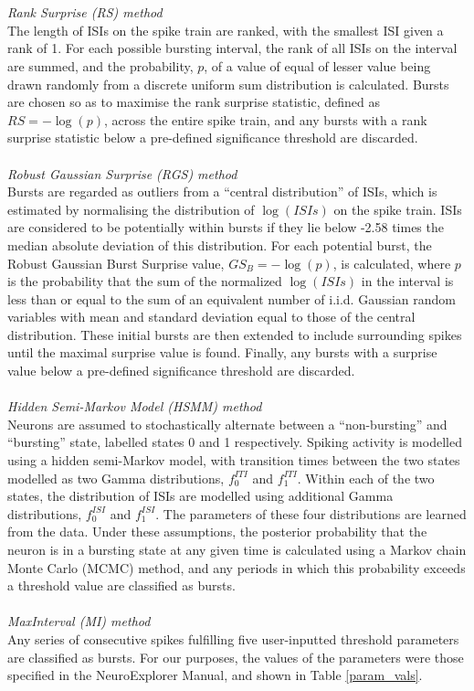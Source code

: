 \documentclass[12pt, titlepage]{article}
\begin{document}
	\\ \\ \textit{Rank Surprise (RS) method \cite{Gourevitch2007}}
	\\The length of ISIs on the spike train are ranked,  with the smallest ISI given a rank of 1. For each possible bursting interval, the rank of all ISIs on the interval are summed, and the probability, $p$, of a value of equal of lesser value  being drawn randomly from a discrete uniform sum distribution is calculated. Bursts are chosen so as to maximise the rank surprise statistic, defined as $RS=-\log(p)$, across the entire spike train, and any bursts with a rank surprise statistic below a pre-defined significance threshold are discarded\nocite{Gourevitch2007}. 
	\\ \\ \textit{Robust Gaussian Surprise (RGS) method \cite{Ko2012}}
	\\Bursts are regarded as outliers from a ``central distribution'' of ISIs, which is estimated by normalising the distribution of $\log(ISIs)$ on the spike train. ISIs are considered to be potentially within bursts if they lie below -2.58 times the median absolute deviation of this distribution. For each potential burst, the Robust Gaussian Burst Surprise value, $GS_B=-\log(p)$, is calculated, where $p$ is the probability that the sum of the normalized $\log(ISIs)$ in the interval is less than or equal to the sum of an equivalent number of i.i.d. Gaussian random variables with mean and standard deviation equal to those of the central distribution. These initial bursts are then extended to include surrounding spikes until the maximal surprise value is found. Finally, any bursts with a surprise value below a pre-defined significance threshold are discarded.
	\\ \\ \textit{Hidden Semi-Markov Model (HSMM) method \cite{Tokdar2010}}
	\\Neurons are assumed to stochastically alternate between a ``non-bursting'' and ``bursting'' state, labelled states 0 and 1 respectively. Spiking activity is modelled using a hidden semi-Markov model, with transition times between the two states modelled as two Gamma distributions,  $f_0^{ITI}$ and $f_1^{ITI}$.  Within each of the two states, the distribution of ISIs are modelled using additional Gamma distributions, $f_0^{ISI}$ and $f_1^{ISI}$. The parameters of these four distributions are learned from the data. Under these assumptions, the posterior probability that the neuron is in a bursting state at any given time is calculated using a Markov chain Monte Carlo (MCMC) method, and any periods in which this probability exceeds a threshold value are classified as bursts.
	\\ \\ \textit{MaxInterval (MI) method  \cite{NEmanual}}
	\\Any series of consecutive spikes fulfilling five user-inputted threshold parameters are classified as bursts. For our purposes, the values of the parameters were those specified in the NeuroExplorer Manual, and shown in Table \ref{param_vals}.
\end{document}
